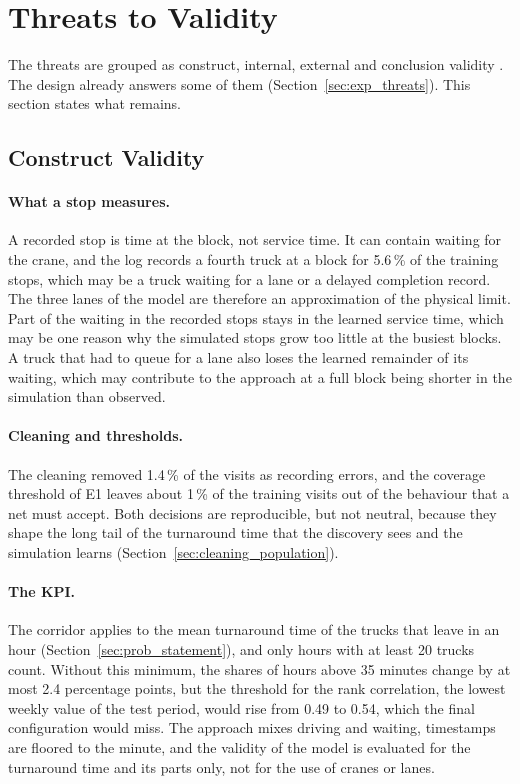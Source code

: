 \section{Threats to Validity}
\label{sec:disc_threats}

The threats are grouped as construct, internal, external and conclusion validity
\cite{Wohlin2012Experimentation}. The design already answers some of them
(Section~\ref{sec:exp_threats}). This section states what remains.

\subsection{Construct Validity}
\paragraph{What a stop measures.} A recorded stop is time at the block, not service
time. It can contain waiting for the crane, and the log records a fourth truck at a
block for 5.6\,\% of the training stops, which may be a truck waiting for a lane or a
delayed completion record. The three lanes of the model are therefore an
approximation of the physical limit. Part of the waiting in the recorded stops stays
in the learned service time, which may be one reason why the simulated stops grow too
little at the busiest blocks.  A truck that had to queue for a lane also loses the
learned remainder of its waiting, which may contribute to the approach at a full
block being shorter in the simulation than observed.

\paragraph{Cleaning and thresholds.} The cleaning removed 1.4\,\% of the visits as
recording errors, and the coverage threshold of E1 leaves about 1\,\% of the training
visits out of the behaviour that a net must accept. Both decisions are reproducible,
but not neutral, because they shape the long tail of the turnaround time that the
discovery sees and the simulation learns (Section~\ref{sec:cleaning_population}).

\paragraph{The KPI.} The corridor applies to the mean turnaround time of the trucks
that leave in an hour (Section~\ref{sec:prob_statement}), and only hours with at least
20 trucks count. Without this minimum, the shares of hours above 35 minutes change by
at most 2.4 percentage points, but the threshold for the rank correlation, the lowest
weekly value of the test period, would rise from 0.49 to 0.54, which the final
configuration would miss. The approach mixes
driving and waiting, timestamps are floored to the minute, and the validity of the
model is evaluated for the turnaround time and its parts only, not for the use of
cranes or lanes.

